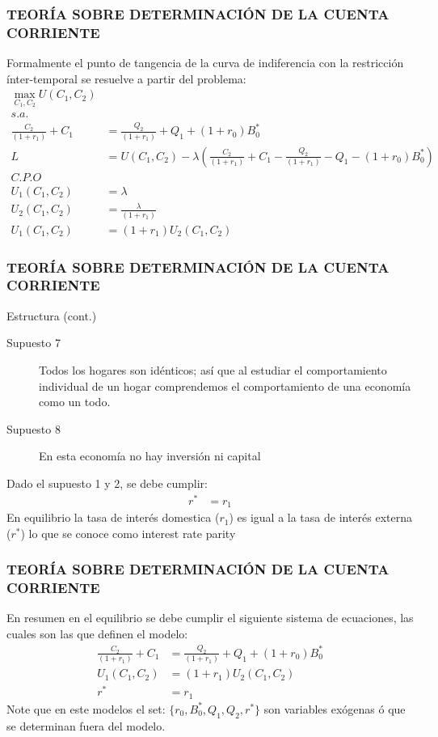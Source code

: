 \documentclass[10pt, xcolor=table, x11names]{beamer}
\begin{document}
\begin{frame}[label=6]
	\frametitle{{\normalsize TEORÍA SOBRE DETERMINACIÓN DE LA CUENTA CORRIENTE} {}}
Formalmente el punto de tangencia de la curva de indiferencia con la restricción ínter-temporal se resuelve a partir del problema:
	\begin{align}
	\max_{C_{1}, C_{2}} U(C_{1}, C_{2})\nonumber \\
	s.a.\nonumber \\
	\frac{C_{2}}{(1+r_{1})}+C_{1}&=\frac{Q_{2}}{(1+r_{1})}+Q_{1} +(1+r_{0})B_{0}^{*}\nonumber \\
	L&=U(C_{1}, C_{2})-\lambda(\frac{C_{2}}{(1+r_{1})}+C_{1}-\frac{Q_{2}}{(1+r_{1})}-Q_{1} -(1+r_{0})B_{0}^{*})\nonumber \\
	C.P.O\nonumber \\
	U_{1}(C_{1}, C_{2})&=\lambda \nonumber \\
	U_{2}(C_{1}, C_{2})&=\frac{\lambda}{(1+r_{1})} \nonumber \\
	U_{1}(C_{1}, C_{2})&=(1+r_{1})U_{2}(C_{1}, C_{2}) 
	\end{align}

\end{frame}

\begin{frame}[label=7]
	\frametitle{{\normalsize TEORÍA SOBRE DETERMINACIÓN DE LA CUENTA CORRIENTE} {}}
	\begin{block} {Estructura (cont.)}
		\begin{description}
			\item[Supuesto 7] Todos los hogares son idénticos; así que al estudiar el comportamiento individual de un hogar comprendemos el comportamiento de una economía como un todo.
			\item[Supuesto 8] En esta economía no hay inversión ni capital 
		\end{description}
	\end{block}	
	Dado el supuesto 1 y 2, se debe cumplir:\\
	\begin{align}
	r^{*}&=r_{1}
	\end{align}
	En equilibrio la tasa de interés domestica ($ r_{1}$) es igual a la tasa de interés externa ($	r^{*} $) lo que se conoce como interest rate parity
\end{frame}

\begin{frame}[label=8]
	\frametitle{{\normalsize TEORÍA SOBRE DETERMINACIÓN DE LA CUENTA CORRIENTE} {}}
	En resumen en el equilibrio se debe cumplir el siguiente sistema de ecuaciones, las cuales son las que definen el modelo:
		\begin{align}
		\frac{C_{2}}{(1+r_{1})}+C_{1}&=\frac{Q_{2}}{(1+r_{1})}+Q_{1} +(1+r_{0})B_{0}^{*} \label{e8}\\
		U_{1}(C_{1}, C_{2})&=(1+r_{1})U_{2}(C_{1}, C_{2}) \\
		r^{*}&=r_{1} 
		\end{align}
	Note que en este modelos el set: $\{r_{0},B_{0}^{*}, Q_{1}, Q_{2}, 	r^{*}\} $ son variables exógenas ó que se determinan fuera del modelo. 
\end{frame}
\end{document}
